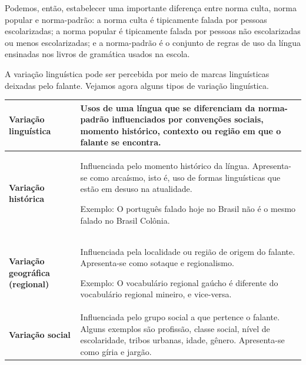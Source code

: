 Podemos, então, estabelecer uma importante diferença entre norma culta,
norma popular e norma-padrão: a norma culta é tipicamente falada por
pessoas escolarizadas; a norma popular é tipicamente falada por pessoas
não escolarizadas ou menos escolarizadas; e a norma-padrão é o conjunto
de regras de uso da língua ensinadas nos livros de gramática usados na
escola.

A variação linguística pode ser percebida por meio de marcas
linguísticas deixadas pelo falante. Vejamos agora alguns tipos de
variação linguística.

\begin{longtable}[]{@{}ll@{}}
\toprule
\begin{minipage}[b]{0.46\columnwidth}\raggedright
\textbf{Variação linguística}\strut
\end{minipage} & \begin{minipage}[b]{0.46\columnwidth}\raggedright
Usos de uma língua que se diferenciam da norma-padrão influenciados por
convenções sociais, momento histórico, contexto ou região em que o
falante se encontra.\strut
\end{minipage}\tabularnewline
\midrule
\endhead
\begin{minipage}[t]{0.46\columnwidth}\raggedright
\textbf{Variação histórica}\strut
\end{minipage} & \begin{minipage}[t]{0.46\columnwidth}\raggedright
Influenciada pelo momento histórico da língua. Apresenta-se como
arcaísmo, isto é, uso de formas linguísticas que estão em desuso na
atualidade.

Exemplo: O português falado hoje no Brasil não é o mesmo falado no
Brasil Colônia.\strut
\end{minipage}\tabularnewline
\begin{minipage}[t]{0.46\columnwidth}\raggedright
\textbf{Variação geográfica (regional)}\strut
\end{minipage} & \begin{minipage}[t]{0.46\columnwidth}\raggedright
Influenciada pela localidade ou região de origem do falante.
Apresenta-se como sotaque e regionalismo.

Exemplo: O vocabulário regional gaúcho é diferente do vocabulário
regional mineiro, e vice-versa.\strut
\end{minipage}\tabularnewline
\begin{minipage}[t]{0.46\columnwidth}\raggedright
\textbf{Variação social}\strut
\end{minipage} & \begin{minipage}[t]{0.46\columnwidth}\raggedright
Influenciada pelo grupo social a que pertence o falante. Alguns exemplos
são profissão, classe social, nível de escolaridade, tribos urbanas,
idade, gênero. Apresenta-se como gíria e jargão.


\end{minipage}
\end{longtable}
